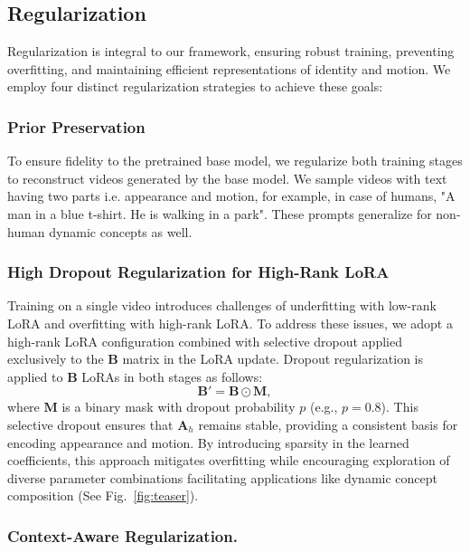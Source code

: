 \subsection{Regularization}
\label{sec:reg}

Regularization is integral to our framework, ensuring robust training, preventing overfitting, and maintaining efficient representations of identity and motion. We employ four distinct regularization strategies to achieve these goals:

\subsubsection{Prior Preservation~\cite{ruiz2023dreambooth,roich2022pivotal}}
To ensure fidelity to the pretrained base model, we regularize both training stages to reconstruct videos generated by the base model. We sample videos with text having two parts i.e. appearance and motion, for example, in case of humans, "A man in a blue t-shirt. He is walking in a park". These prompts generalize for non-human dynamic concepts as well.



\subsubsection{High Dropout Regularization for High-Rank LoRA}
Training on a single video introduces challenges of underfitting with low-rank LoRA and overfitting with high-rank LoRA. To address these issues, we adopt a high-rank LoRA configuration combined with selective dropout applied exclusively to the $\mathbf{B}$ matrix in the LoRA update. Dropout regularization is applied to $\mathbf{B}$ LoRAs in both stages as follows:
\begin{equation}
\mathbf{B}' = \mathbf{B} \odot \mathbf{M},
\end{equation}
where $\mathbf{M}$ is a binary mask with dropout probability $p$ (e.g., $p = 0.8$). This selective dropout ensures that $\mathbf{A}_h$ remains stable, providing a consistent basis for encoding appearance and motion. By introducing sparsity in the learned coefficients, this approach mitigates overfitting while encouraging exploration of diverse parameter combinations facilitating applications like dynamic concept composition (See Fig.~\ref{fig:teaser}).



\subsubsection{Context-Aware Regularization.}


